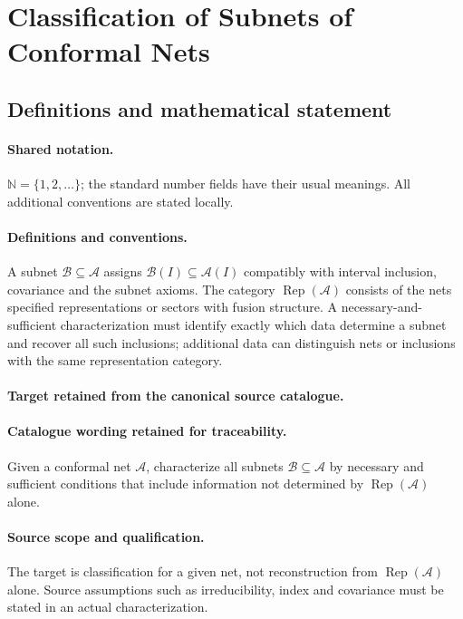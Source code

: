\documentclass[11pt]{article}
\begin{document}
\section{Classification of Subnets of Conformal Nets}\label{statement}

\subsection{Definitions and mathematical statement}

\paragraph{Shared notation.}$\mathbb N=\{1,2,\ldots\}$; the standard number fields have their usual meanings. All additional conventions are stated locally.


\paragraph{Definitions and conventions.}
A subnet $\mathcal B\subseteq\mathcal A$ assigns $\mathcal B(I)\subseteq\mathcal A(I)$ compatibly with interval inclusion, covariance and the subnet axioms. The category $\operatorname{Rep}(\mathcal A)$ consists of the net\textquotesingle s specified representations or sectors with fusion structure. A necessary-and-sufficient characterization must identify exactly which data determine a subnet and recover all such inclusions; additional data can distinguish nets or inclusions with the same representation category.

\paragraph{Target retained from the canonical source catalogue.}
\paragraph{Catalogue wording retained for traceability.}
Given a conformal net $\mathcal A$, characterize all subnets $\mathcal B\subseteq\mathcal A$ by necessary and sufficient conditions that include information not determined by $\operatorname{Rep}(\mathcal A)$ alone.

\paragraph{Source scope and qualification.}
The target is classification for a given net, not reconstruction from $\operatorname{Rep}(\mathcal A)$ alone. Source assumptions such as irreducibility, index and covariance must be stated in an actual characterization.
\end{document}
